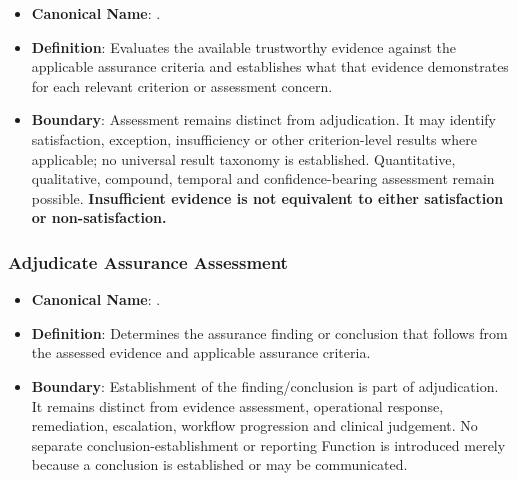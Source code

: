 \begin{itemize}

\item 
\textbf{Canonical Name}: \texttt{}.



\item 
\textbf{Definition}: Evaluates the available trustworthy evidence against the applicable assurance criteria and establishes what that evidence demonstrates for each relevant criterion or assessment concern.



\item 
\textbf{Boundary}: Assessment remains distinct from adjudication. It may identify satisfaction, exception, insufficiency or other criterion-level results where applicable; no universal result taxonomy is established. Quantitative, qualitative, compound, temporal and confidence-bearing assessment remain possible. \textbf{Insufficient evidence is not equivalent to either satisfaction or non-satisfaction.}



\end{itemize}
\label{rad:assurance:114}



\label{rad:assurance:116}
\subsubsection*{Adjudicate Assurance Assessment}
\label{rad:assurance:118}

\begin{itemize}

\item 
\textbf{Canonical Name}: \texttt{}.



\item 
\textbf{Definition}: Determines the assurance finding or conclusion that follows from the assessed evidence and applicable assurance criteria.



\item 
\textbf{Boundary}: Establishment of the finding/\allowbreak{}conclusion is part of adjudication. It remains distinct from evidence assessment, operational response, remediation, escalation, workflow progression and clinical judgement. No separate conclusion-establishment or reporting Function is introduced merely because a conclusion is established or may be communicated.



\end{itemize}
\label{rad:assurance:122}
